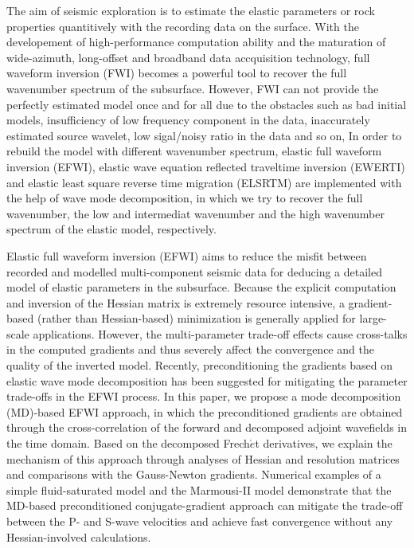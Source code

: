 \begin{eabstract}
	The aim of seismic exploration is to estimate the elastic parameters or rock properties
	quantitively                                              
	with the recording data on the surface. With the developement of 
	high-performance computation ability and the
	maturation of wide-azimuth, long-offset and broadband data accquisition 
	technology, full waveform inversion (FWI) becomes a powerful tool to recover the full
	 wavenumber spectrum of the subsurface. However, FWI can not provide the perfectly estimated
	model
	once and for all due to the obstacles such as bad initial models,
	insufficiency of low frequency component in the data, inaccurately estimated source
	wavelet, low sigal/noisy ratio in the data and so on,
	In order to rebuild the model with different wavenumber spectrum, elastic full waveform
	inversion (EFWI), elastic wave equation 
	reflected traveltime inversion (EWERTI) and elastic least square reverse time
	migration (ELSRTM) are implemented with the help of wave mode decomposition, in which we
	try to recover the full wavenumber, the low and intermediat wavenumber
	and the high wavenumber spectrum of the elastic model, respectively.

Elastic full waveform inversion (EFWI) aims to reduce the misfit between recorded and modelled multi-component
seismic data for deducing a detailed model of elastic parameters in the subsurface.
Because the explicit computation and inversion of the Hessian matrix
is extremely resource intensive,
a gradient-based (rather than Hessian-based) minimization is generally applied for large-scale applications.
However, the multi-parameter trade-off effects cause cross-talks in the computed gradients and
thus severely affect the convergence and the quality of the inverted model.
Recently, preconditioning the gradients based on elastic wave mode decomposition
has been suggested for mitigating the parameter trade-offs in the EFWI process.
In this paper, we propose a mode decomposition (MD)-based EFWI approach, in which the preconditioned gradients
are obtained through the cross-correlation of the forward and
decomposed adjoint wavefields in the time domain.
Based on the decomposed Frech{$\acute{e}$}t derivatives,
we explain the mechanism of this approach through analyses of Hessian and resolution matrices
and comparisons with the Gauss-Newton gradients.
Numerical examples of a simple fluid-saturated model and the Marmousi-II model
demonstrate that the MD-based preconditioned conjugate-gradient approach
can mitigate the trade-off between the P- and S-wave velocities and achieve fast
convergence without any Hessian-involved calculations.


\end{eabstract}
